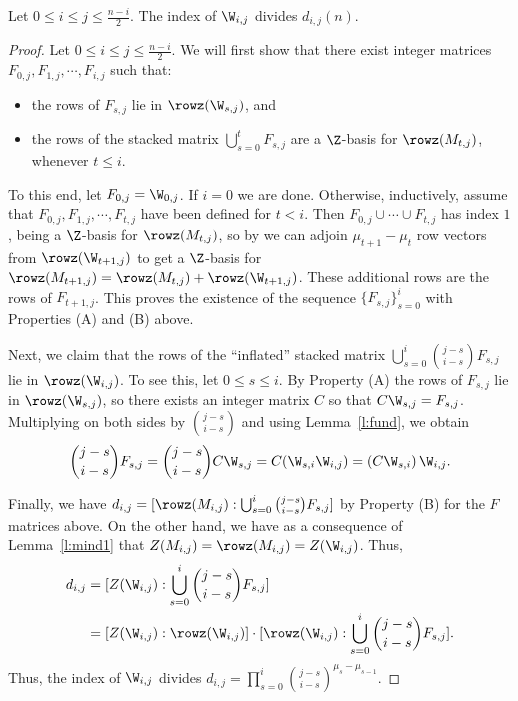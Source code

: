 \begin{lemma}\label{thm:index}
Let $0 \leq i \leq j \leq \frac{n-i}{2}$.  The index of $\W_{i,j}$ divides $d_{i,j}(n)$.
\end{lemma}
\begin{proof}
Let $0 \leq i \leq j \leq \frac{n-i}{2}$.  We will first show that there exist integer matrices $F_{0,j}, F_{1,j}, \cdots , F_{i,j}$ such that:
\begin{itemize}
    \item[(A)] the rows of $F_{s,j}$ lie in $\rowz(\W_{s,j})$, and
    \item[(B)] the rows of the stacked matrix $\bigcup_{s=0}^t F_{s,j}$ are a $\Z$-basis for $\rowz(M_{t,j})$, whenever $t \leq i$.
\end{itemize}
To this end, let $F_{0,j} = \W_{0,j}$.  If $i=0$ we are done.  Otherwise, inductively, assume that $F_{0,j}, F_{1,j}, \cdots , F_{t, j}$ have been defined for $t < i$.  Then $F_{0,j} \cup \cdots \cup F_{t,j}$ has index $1$, being a $\Z$-basis for $\rowz(M_{t,j})$, so by \cite[Proposition 2]{wilson_classic} we can adjoin $\mu_{t+1}-\mu_{t}$ row vectors from $\rowz(\W_{t+1,j})$ to get a $\Z$-basis for $\rowz(M_{t+1,j}) = \rowz(M_{t,j}) + \rowz(\W_{t+1,j})$.  These additional rows are the rows of $F_{t+1,j}$.  This proves the existence of the sequence $\{F_{s,j}\}_{s=0}^{i}$ with Properties (A) and (B) above.

Next, we claim that the rows of the ``inflated'' stacked matrix $\bigcup_{s=0}^{i}\binom{j-s}{i-s} F_{s,j}$ lie in $\rowz(\W_{i,j})$.  To see this, let $0 \leq s \leq i$.  By Property (A) the rows of $F_{s,j}$ lie in $\rowz(\W_{s,j})$, so there exists an integer matrix $C$ so that $C \W_{s,j} = F_{s,j}$.  Multiplying on both sides by $\binom{j-s}{i-s}$ and using Lemma~\ref{l:fund}, we obtain
\[ \binom{j-s}{i-s} F_{s,j} = \binom{j-s}{i-s} C \W_{s,j} = C (\W_{s,i} \W_{i,j}) = \left(C \W_{s,i}\right) \W_{i,j}. \]

Finally, we have $d_{i,j} = [\rowz(M_{i,j}): \bigcup_{s=0}^{i}\binom{j-s}{i-s} F_{s,j}]$ by Property (B) for the $F$ matrices above.
On the other hand, we have as a consequence of Lemma~\ref{l:mind1} that $Z(M_{i,j}) = \rowz(M_{i,j}) = Z(\W_{i,j})$.  Thus, 
\begin{align*} 
d_{i,j} &= [Z(\W_{i,j}) : \bigcup_{s=0}^{i}\binom{j-s}{i-s} F_{s,j}]\\ 
&= [Z(\W_{i,j}) :   \rowz(\W_{i,j}) ]   \cdot  [\rowz(\W_{i,j}) :  \bigcup_{s=0}^{i}\binom{j-s}{i-s} F_{s,j}].
\end{align*}
Thus, the index of $\W_{i,j}$ divides $d_{i,j} = \prod_{s=0}^{i} \binom{j-s}{i-s}^{\mu_{s} - \mu_{s-1}}$.
\end{proof}



